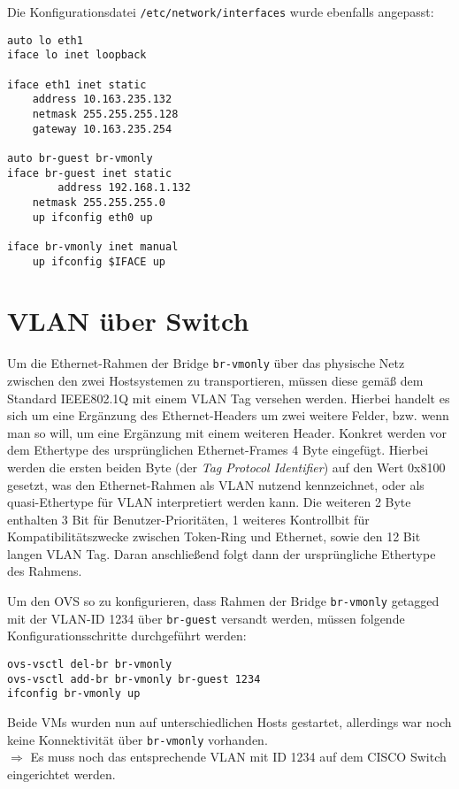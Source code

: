 Die Konfigurationsdatei \verb#/etc/network/interfaces# wurde ebenfalls angepasst:
\setupVerbatimOut
\begin{verbatim}
auto lo eth1
iface lo inet loopback

iface eth1 inet static
    address 10.163.235.132
	netmask 255.255.255.128
	gateway 10.163.235.254

auto br-guest br-vmonly
iface br-guest inet static
        address 192.168.1.132
	netmask 255.255.255.0
	up ifconfig eth0 up

iface br-vmonly inet manual 
	up ifconfig $IFACE up 
\end{verbatim}

\section{VLAN über Switch}
Um die Ethernet-Rahmen der Bridge \verb#br-vmonly# über das physische Netz zwischen den zwei Hostsystemen zu transportieren, müssen diese gemäß dem Standard IEEE802.1Q \cite{ieee8021q} mit einem VLAN Tag versehen werden. Hierbei handelt es sich um eine Ergänzung des Ethernet-Headers um zwei weitere Felder, bzw. wenn man so will, um eine Ergänzung mit einem weiteren Header. Konkret werden vor dem Ethertype des ursprünglichen Ethernet-Frames 4 Byte eingefügt. Hierbei werden die ersten beiden Byte (der \emph{Tag Protocol Identifier}) auf den Wert 0x8100 gesetzt, was den Ethernet-Rahmen als VLAN nutzend kennzeichnet, oder als quasi-Ethertype für VLAN interpretiert werden kann. Die weiteren 2 Byte enthalten 3 Bit für Benutzer-Prioritäten, 1 weiteres Kontrollbit für Kompatibilitätszwecke zwischen Token-Ring und Ethernet, sowie den 12 Bit langen VLAN Tag. Daran anschließend folgt dann der ursprüngliche Ethertype des Rahmens.

Um den OVS so zu konfigurieren, dass Rahmen der Bridge \verb#br-vmonly# getagged mit der VLAN-ID 1234 über \verb#br-guest# versandt werden, müssen folgende Konfigurationsschritte durchgeführt werden:\setupVerbatimOut
\begin{verbatim}
ovs-vsctl del-br br-vmonly
ovs-vsctl add-br br-vmonly br-guest 1234
ifconfig br-vmonly up
\end{verbatim}
Beide VMs wurden nun auf unterschiedlichen Hosts gestartet, allerdings war noch keine Kon\-nek\-tiv\-ität über \verb#br-vmonly# vorhanden.
\\
$\Rightarrow$ Es muss noch das entsprechende VLAN mit ID 1234 auf dem CISCO Switch eingerichtet werden.\\

